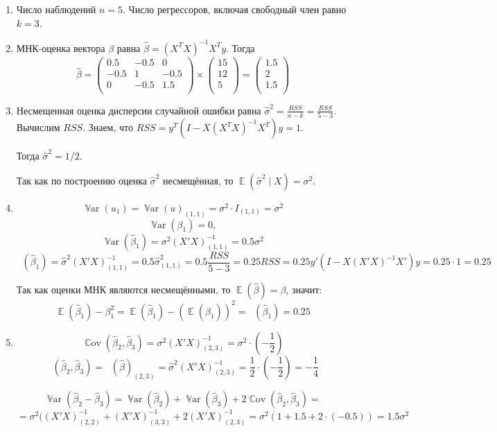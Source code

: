 \documentclass[12pt]{article}
\DeclareMathOperator{\Cov}{\mathbb{C}ov}
\DeclareMathOperator{\Var}{\mathbb{V}ar}
\DeclareMathOperator{\hVar}{\widehat{\Var}}
\DeclareMathOperator{\hCov}{\widehat{\Cov}}
\DeclareMathOperator{\E}{\mathbb{E}}
\newcommand{\hb}{\hat{\beta}}
\newcommand{\hs}{\hat{\sigma}}
\newcommand{\RSS}{RSS}
\begin{document}
\begin{problem}
\begin{sol}
\begin{enumerate}
\item Число наблюдений $n=5$. Число регрессоров, включая свободный член равно $k=3$.
\item МНК-оценка вектора $\beta$ равна $\hb = (X^TX)^{-1}X^Ty$. Тогда
\[
\hb = \begin{pmatrix}
  0.5 & -0.5 & 0 \\
  -0.5 & 1 & -0.5 \\
  0 & -0.5 & 1.5 \\
  \end{pmatrix} \times
  \begin{pmatrix}
  15 \\
  12 \\
  5 \\
  \end{pmatrix} = 
  \begin{pmatrix}
  1.5 \\
  2 \\
  1.5 \\
  \end{pmatrix}
\]
\item Несмещенная оценка дисперсии случайной ошибки равна $\hs^2 = \frac{RSS}{n-k} = \frac{RSS}{5-3}$.
Вычислим $RSS$. Знаем, что $RSS = y^T(I-X(X^TX)^{-1}X^T)y = 1$. 

Тогда $\hs^2 = 1/2$.

Так как по построению оценка $\hs^2$ несмещённая, то $\E (\hs^2 \mid X) = \sigma^2$.

\item
\[
\Var(u_1)=\Var(u)_{(1,1)}=\sigma^2\cdot I_{(1,1)}=\sigma^2
\]
\[
\Var(\beta_1)=0,
\]
\[
\Var(\hb_1)=\sigma^2(X'X)^{-1}_{(1,1)}=0.5\sigma^2
\]
\[
\hVar(\hb_1)=\hat\sigma^2(X'X)^{-1}_{(1,1)}=0.5\hat\sigma^2_{(1,1)}=0.5\frac{\RSS}{5-3}=0.25\RSS=0.25y'(I-X(X'X)^{-1}X')y=0.25\cdot 1=0.25
\]

Так как оценки МНК являются несмещёнными, то $\E(\hb)=\beta$, значит:
\[
\E(\hb_1)-\beta_1^2=\E(\hb_1)-(\E(\hb_1))^2=\hVar(\hb_1)=0.25
\]

\item 
\[
\Cov(\hb_2,\hb_3)=\sigma^2(X'X)^{-1}_{(2,3)}=\sigma^2\cdot\left(-\frac12\right)
\]
\[
\hCov(\hb_2,\hb_3)=\hVar(\hb)_{(2,3)}=\hat\sigma^2(X'X)^{-1}_{(2,3)}=\frac12\cdot\left(-\frac12\right) = -\frac{1}{4}
\]

\[
\Var(\hb_2-\hb_3)=\Var(\hb_2)+\Var(\hb_3)+2\Cov(\hb_2,\hb_3)=
\]
\[
=\sigma^2((X'X)^{-1}_{(2,2)}+(X'X)^{-1}_{(3,3)}+2(X'X)^{-1}_{(2,3)}=\sigma^2(1+1.5+2\cdot(-0.5))=1.5\sigma^2
\]


\end{enumerate}
\end{sol}
\end{problem}
\end{document}
